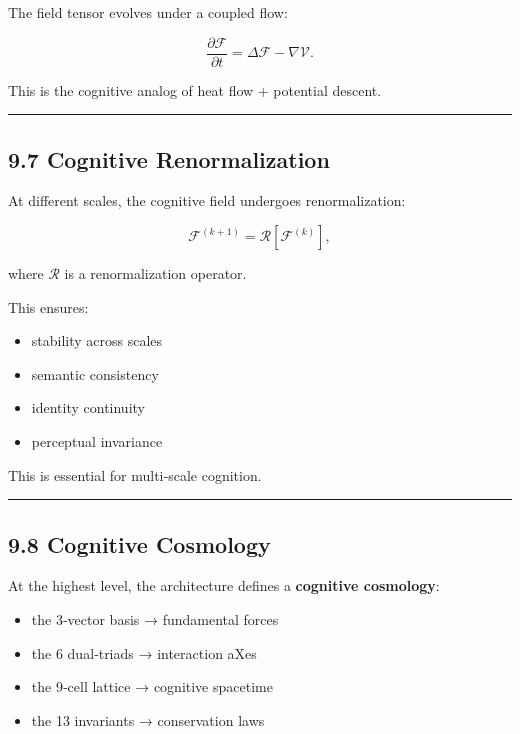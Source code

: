 The field tensor evolves under a coupled flow:

\[
\frac{\partial \mathcal{F}}{\partial t} = \Delta \mathcal{F} - \nabla \mathcal{V}.
\]

This is the cognitive analog of heat flow + potential descent.

\begin{center}\rule{0.5\linewidth}{0.5pt}\end{center}

\subsection{9.7 Cognitive Renormalization}\label{cognitive-renormalization}

At different scales, the cognitive field undergoes renormalization:

\[
\mathcal{F}^{(k+1)} = \mathcal{R}[\mathcal{F}^{(k)}],
\]

where \(\mathcal{R}\) is a renormalization operator.

This ensures:

\begin{itemize}
\tightlist
\item
  stability across scales\\
\item
  semantic consistency\\
\item
  identity continuity\\
\item
  perceptual invariance
\end{itemize}

This is essential for multi‑scale cognition.

\begin{center}\rule{0.5\linewidth}{0.5pt}\end{center}

\subsection{9.8 Cognitive Cosmology}\label{cognitive-cosmology}

At the highest level, the architecture defines a \textbf{cognitive cosmology}:

\begin{itemize}
\tightlist
\item
  the 3‑vector basis → fundamental forces\\
\item
  the 6 dual‑triads → interaction aXes\\
\item
  the 9‑cell lattice → cognitive spacetime\\
\item
  the 13 invariants → conservation laws
\end{itemize}

